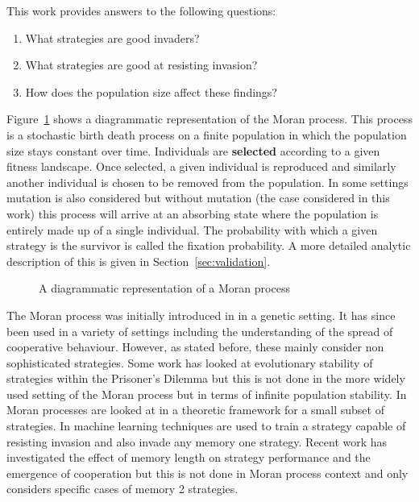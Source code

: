 \documentclass{article}
\begin{document}
This work provides answers to the following questions:

\begin{enumerate}
    \item What strategies are good invaders?
    \item What strategies are good at resisting invasion?
    \item How does the population size affect these findings?
\end{enumerate}

Figure~\ref{fig:moran_process} shows a diagrammatic representation of the Moran
process. This process is a stochastic birth death process on a finite population
in which the population size stays constant over time. Individuals are
\textbf{selected} according to a given fitness landscape. Once selected, a given
individual is reproduced and similarly another individual is chosen to be
removed from the population. In some settings mutation is also considered but
without mutation (the case considered in this work) this process will arrive at
an absorbing state where the population is entirely made up of a single
individual. The probability with which a given strategy is the survivor is
called the fixation probability. A more detailed analytic description of this
is given in Section~\ref{sec:validation}.

\begin{figure}[!hbtp]
    \centering
    
    \caption{A diagrammatic representation of a Moran process}
    \label{fig:moran_process}
\end{figure}

The Moran process was initially introduced in \cite{Moran1957} in a genetic
setting. It has since been used in a variety of settings including the
understanding of the spread of cooperative behaviour. However, as stated before,
these mainly consider non sophisticated strategies. Some work has looked at
evolutionary stability of strategies within the Prisoner's Dilemma \cite{Li2014}
but this is not done in the more widely used setting of the Moran process but in
terms of infinite population stability. In \cite{Baek2016} Moran processes are
looked at in a theoretic framework for a small subset of strategies. In
\cite{Lee2015} machine learning techniques are used to train a strategy capable
of resisting invasion and also invade any memory one strategy. Recent work
\cite{Hilbe2017} has investigated the effect of memory length on strategy
performance and the emergence of cooperation but this is not done in Moran
process context and only considers specific cases of memory 2 strategies.
\end{document}
